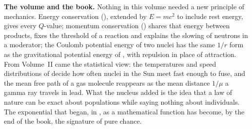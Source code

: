 \medskip
\textbf{The volume and the book.} Nothing in this volume needed a new principle of mechanics. Energy
conservation (), extended by $E=mc^2$ to include rest energy, gives every $Q$-value; momentum
conservation () shares that energy between products, fixes the threshold of a reaction and
explains the slowing of neutrons in a moderator; the Coulomb potential energy of two nuclei has the same
$1/r$ form as the gravitational potential energy of , with repulsion in place of
attraction. From Volume~II came the statistical view: the temperatures and speed distributions of
 decide how often nuclei in the Sun meet fast enough to fuse, and the mean free path of a
gas molecule reappears as the mean distance $1/\mu$ a gamma ray travels in lead. What the nucleus added is
the idea that a law of nature can be exact about populations while saying nothing about individuals. The
exponential that began, in , as a mathematical function has become, by the end of the book,
the signature of pure chance.
